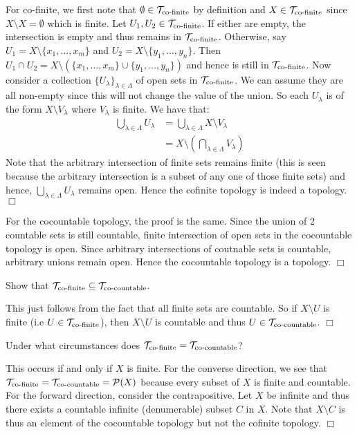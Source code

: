 \documentclass{article}
\begin{document}
\begin{spacedenumerate}
\begin{spacedenumerate}
        For co-finite, we first note that $\emptyset\in \mathcal{T}_{\text{co-finite}}$ by definition and $X\in \mathcal{T}_{\text{co-finite}}$ since $X\setminus X = \emptyset$ which is finite. Let $U_{1},U_{2}\in\mathcal{T}_{\text{co-finite}}$. If either are empty, the intersection is empty and thus remains in $\mathcal{T}_{\text{co-finite}}$. Otherwise, say $U_{1} = X\setminus\{x_{1},\dots, x_{m}\}$ and $U_{2} = X\setminus \{y_{1},\dots, y_{n}\}$. Then $U_{1}\cap U_{2} = X\setminus (\{x_{1},\dots, x_{m}\}\cup \{y_{1},\dots, y_{n}\})$ and hence is still in $\mathcal{T}_{\text{co-finite}}$. Now consider a collection $\{U_{\lambda}\}_{\lambda\in \Lambda}$ of open sets in $\mathcal{T}_{\text{co-finite}}$. We can assume they are all non-empty since this will not change the value of the union. So each $U_{\lambda}$ is of the form $X\setminus V_{\lambda}$ where $V_{\lambda}$ is finite. We have that:
        \begin{align*}
            \bigcup_{\lambda\in\Lambda}U_{\lambda} &= \bigcup_{\lambda\in\Lambda}X\setminus V_{\lambda}\\
            &= X\setminus\left(\bigcap_{\lambda\in \Lambda} V_{\lambda}\right)
        \end{align*}
        Note that the arbitrary intersection of finite sets remains finite (this is seen because the arbitrary intersection is a subset of any one of those finite sets) and hence, $\bigcup_{\lambda\in\Lambda}U_{\lambda}$ remains open. Hence the cofinite topology is indeed a topology. $\Box$

        For the cocountable topology, the proof is the same. Since the union of 2 countable sets is still countable, finite intersection of open sets in the cocountable topology is open. Since arbitrary intersections of coutnable sets is countable, arbitrary unions remain open. Hence the cocountable topology is a topology. $\Box$
        \item Show that $\mathcal{T}_{\text{co-finite}} \subseteq \mathcal{T}_{\text{co-countable}}$.
        
        This just follows from the fact that all finite sets are countable. So if $X\setminus U$ is finite (i.e $U\in \mathcal{T}_{\text{co-finite}}$), then $X\setminus U$ is countable and thus $U\in \mathcal{T}_{\text{co-countable}}$. $\Box$
        \item Under what circumstances does $\mathcal{T}_{\text{co-finite}} = \mathcal{T}_{\text{co-countable}}$?
        
        This occurs if and only if $X$ is finite. For the converse direction, we see that $\mathcal{T}_{\text{co-finite}} = \mathcal{T}_{\text{co-countable}} = \mathcal{P}(X)$ because every subset of $X$ is finite and countable. For the forward direction, consider the contrapositive. Let $X$ be infinite and thus there exists a countable infinite (denumerable) subset $C$ in $X$. Note that $X\setminus C$ is thus an element of the cocountable topology but not the cofinite topology. $\Box$


\end{spacedenumerate}
\end{spacedenumerate}
\end{document}
